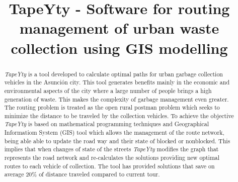 \documentclass[conference]{IEEEtran}
\begin{document}
\title{TapeYty - Software for routing management of urban waste collection using GIS modelling\\
}

\author{
}

\begin{otherlanguage}{english}
\maketitle
\begin{abstract}
\textit{TapeYty} is a tool developed to calculate optimal paths for urban garbage collection vehicles in the Asunción city. This tool generates benefits mainly in the economic and environmental aspects of the city where a large number of people brings a high generation of waste. This makes the complexity of garbage management even greater. The routing problem is treated as the open rural postman problem which seeks to minimize the distance to be traveled by the collection vehicles. To achieve the objective \textit{TapeYty} is based on mathematical programming techniques and Geographical Informatiom System (GIS) tool which allows the management of the route network, being able able to update the road way and their state of blocked or nonblocked. This implies that when changes of state of the streets \textit{TapeYty} modifies the graph that represents the road network and re-calculates the solutions providing new optimal routes to each vehicle of collection. The tool has provided solutions that save on average 20\% of distance traveled compared to current tour.
\end{abstract}
\end{otherlanguage}
\end{document}
